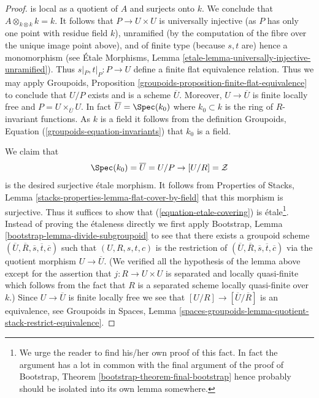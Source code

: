\begin{proof}
is local as a quotient of $A$ and surjects onto $k$. We conclude that
$A \otimes_{k \otimes k} k = k$. It follows that $P \to U \times U$
is universally injective (as $P$ has only one point with residue field $k$),
unramified (by the computation of the fibre over the unique image point
above), and of finite type (because $s, t$ are) hence a monomorphism (see
\'Etale Morphisms, Lemma
\ref{etale-lemma-universally-injective-unramified}).
Thus $s|_P, t|_P : P \to U$ define a finite flat equivalence
relation. Thus we may apply
Groupoids, Proposition \ref{groupoids-proposition-finite-flat-equivalence}
to conclude that $U/P$ exists and is a scheme $\overline{U}$.
Moreover, $U \to \overline{U}$ is finite locally free and
$P = U \times_{\overline{U}} U$.
In fact $\overline{U} = \Spec(k_0)$ where $k_0 \subset k$ is the
ring of $R$-invariant functions. As $k$ is a field it follows
from the definition
Groupoids, Equation (\ref{groupoids-equation-invariants})
that $k_0$ is a field.

\medskip\noindent
We claim that
\begin{equation}
\label{equation-etale-covering}
\Spec(k_0) = \overline{U} = U/P \to [U/R] = \mathcal{Z}
\end{equation}
is the desired surjective \'etale morphism. It follows from
Properties of Stacks, Lemma \ref{stacks-properties-lemma-flat-cover-by-field}
that this morphism is surjective. Thus it suffices to show that
(\ref{equation-etale-covering}) is \'etale\footnote{We urge the
reader to find his/her own proof of this fact. In fact the argument
has a lot in common with the final argument of the proof of
Bootstrap, Theorem \ref{bootstrap-theorem-final-bootstrap}
hence probably should be isolated into its own lemma somewhere.}.
Instead of proving the \'etaleness
directly we first apply
Bootstrap, Lemma \ref{bootstrap-lemma-divide-subgroupoid}
to see that there exists a groupoid scheme
$(\overline{U}, \overline{R}, \overline{s}, \overline{t}, \overline{c})$
such that $(U, R, s, t, c)$ is the restriction of
$(\overline{U}, \overline{R}, \overline{s}, \overline{t}, \overline{c})$
via the quotient morphism $U \to \overline{U}$.
(We verified all the hypothesis of the lemma above except for the assertion
that $j : R \to U \times U$ is separated and locally quasi-finite
which follows from the fact that $R$ is a separated scheme locally quasi-finite
over $k$.) Since $U \to \overline{U}$ is finite locally free
we see that $[U/R] \to [\overline{U}/\overline{R}]$ is an equivalence, see
Groupoids in Spaces,
Lemma \ref{spaces-groupoids-lemma-quotient-stack-restrict-equivalence}.


\end{proof}
